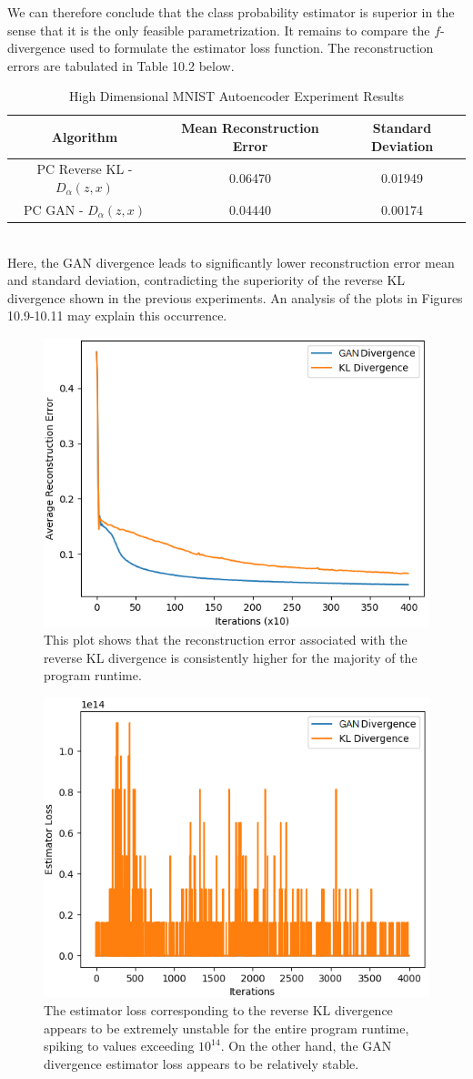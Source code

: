 \documentclass[honours,12pt]{unswthesis}
\numberwithin{equation}{section}
\theoremstyle{definition}
\begin{document}
We can therefore conclude that the class probability estimator is superior in the sense that it is the only feasible parametrization. It remains to compare the $f$-divergence used to formulate the estimator loss function. The reconstruction errors are tabulated in Table 10.2 below.
\begin{table}[h]
\centering
\begin{tabular}{|c|c|c|}
\hline
Algorithm & Mean Reconstruction Error & Standard Deviation\\
\hline
PC Reverse KL - $D_\alpha(z,x)$ & 0.06470 & 0.01949\\
\hline
PC GAN - $D_\alpha(z,x)$ & 0.04440 & 0.00174\\
\hline
\end{tabular}
\caption{High Dimensional MNIST Autoencoder Experiment Results}
\end{table}\\
Here, the GAN divergence leads to significantly lower reconstruction error mean and standard deviation, contradicting the superiority of the reverse KL divergence shown in the previous experiments. An analysis of the plots in Figures 10.9-10.11 may explain this occurrence.
\begin{figure}[h]
\centering
\includegraphics[width=0.49\linewidth]{part4reconerrors/PCADVvsPCKLD.png}
\caption{\small This plot shows that the reconstruction error associated with the reverse KL divergence is consistently higher for the majority of the program runtime.}
\end{figure}
\begin{figure}[h]
\centering
\includegraphics[width=0.49\linewidth]{part4estimatorlosses/PCADVvsPCKLD.png}
\caption{\small The estimator loss corresponding to the reverse KL divergence appears to be extremely unstable for the entire program runtime, spiking to values exceeding $10^{14}$. On the other hand, the GAN divergence estimator loss appears to be relatively stable.}
\end{figure}
\end{document}
